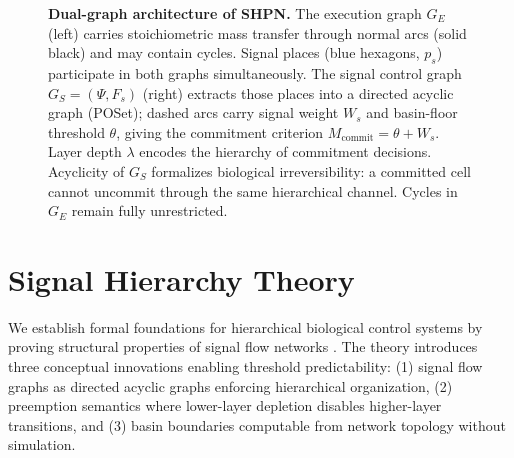 \documentclass[10pt,letterpaper]{article}
\begin{document}
\begin{figure}[t]
\caption{\textbf{Dual-graph architecture of SHPN.} The execution graph $G_E$
(left) carries stoichiometric mass transfer through normal arcs (solid black)
and may contain cycles. Signal places (blue hexagons, $p_s$) participate in
both graphs simultaneously. The signal control graph $G_S = (\Psi, F_s)$
(right) extracts those places into a directed acyclic graph (POSet); dashed
arcs carry signal weight $W_s$ and basin-floor threshold $\theta$, giving the
commitment criterion $M_{\mathrm{commit}} = \theta + W_s$. Layer depth
$\lambda$ encodes the hierarchy of commitment decisions. Acyclicity of $G_S$
formalizes biological irreversibility: a committed cell cannot uncommit through
the same hierarchical channel. Cycles in $G_E$ remain fully unrestricted.}
\label{fig:dual_graph}
\end{figure}

\section{Signal Hierarchy Theory}

We establish formal foundations for hierarchical biological control systems by proving structural properties of signal flow networks \cite{petri1962,murata1989}. The theory introduces three conceptual innovations enabling threshold predictability: (1) signal flow graphs as directed acyclic graphs enforcing hierarchical organization, (2) preemption semantics where lower-layer depletion disables higher-layer transitions, and (3) basin boundaries computable from network topology without simulation.
\end{document}
